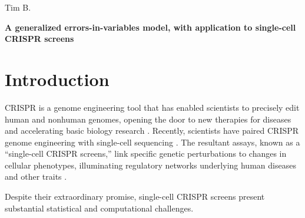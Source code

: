 \documentclass[12pt]{article}
\begin{document}
\noindent
Tim B.
\begin{center}
\textbf{A generalized errors-in-variables model, with application to single-cell CRISPR screens}
\end{center}

\section{Introduction}
CRISPR is a genome engineering tool that has enabled scientists to precisely edit human and nonhuman genomes, opening the door to new therapies for diseases \cite{Rothgangl2021,Musunuru2021} and accelerating basic biology research \cite{Przybyla2021}. Recently, scientists have paired CRISPR genome engineering with single-cell sequencing \cite{Dixit2016,Datlinger2017}. The resultant assays, known as a ``single-cell CRISPR screens,'' link specific genetic perturbations to changes in cellular phenotypes, illuminating regulatory networks underlying human diseases and other traits \cite{Morris2021a}.

Despite their extraordinary promise, single-cell CRISPR screens present substantial statistical and computational challenges. 

	
\end{document}
